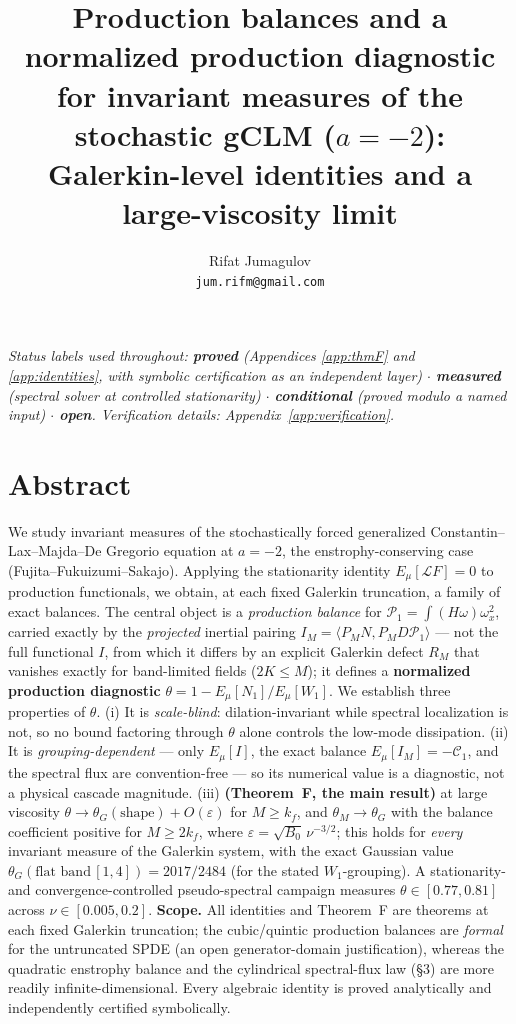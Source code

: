 \documentclass[11pt]{article}
\title{Production balances and a normalized production diagnostic for invariant measures of the stochastic gCLM ($a=-2$): Galerkin-level identities and a large-viscosity limit}
\author{Rifat Jumagulov\\ \texttt{jum.rifm@gmail.com}}
\date{}
\theoremstyle{remark}
\theoremstyle{plain}
\begin{document}
\maketitle

\begin{center}
\emph{Status labels used throughout: \textbf{proved} (Appendices \ref{app:thmF} and
\ref{app:identities}, with symbolic certification as an independent layer) $\cdot$
\textbf{measured} (spectral solver at controlled stationarity) $\cdot$ \textbf{conditional}
(proved modulo a named input) $\cdot$ \textbf{open}. Verification details: Appendix~\ref{app:verification}.}
\end{center}

\bigskip

\section*{Abstract}

We study invariant measures of the stochastically forced generalized
Constantin--Lax--Majda--De Gregorio equation at $a=-2$, the enstrophy-conserving case
(Fujita--Fukuizumi--Sakajo). Applying the stationarity identity $E_\mu[\mathcal{L}F]=0$ to
production functionals, we obtain, at each fixed Galerkin truncation, a family of exact
balances. The central object is a \emph{production balance} for
$\mathcal{P}_1 = \int(H\omega)\omega_x^2$, carried exactly by the \emph{projected} inertial
pairing $I_M = \langle P_M N, P_M D\mathcal{P}_1\rangle$ --- not the full functional $I$, from
which it differs by an explicit Galerkin defect $R_M$ that vanishes exactly for band-limited
fields ($2K \le M$); it
defines a \textbf{normalized production diagnostic} $\theta = 1 - E_\mu[N_1]/E_\mu[W_1]$. We
establish three properties of $\theta$. (i) It is \emph{scale-blind}: dilation-invariant while
spectral localization is not, so no bound factoring through $\theta$ alone controls the low-mode
dissipation. (ii) It is \emph{grouping-dependent} --- only $E_\mu[I]$, the exact balance
$E_\mu[I_M] = -\mathcal{C}_1$, and the spectral flux are
convention-free --- so its numerical value is a diagnostic, not a physical cascade magnitude.
(iii) \textbf{(Theorem~F, the main result)} at large viscosity
$\theta \to \theta_G(\text{shape}) + O(\varepsilon)$ for $M \ge k_f$, and $\theta_M \to \theta_G$ with the
balance coefficient positive for $M \ge 2k_f$, where $\varepsilon = \sqrt{B_0}\,\nu^{-3/2}$; this holds for
\emph{every} invariant measure of the Galerkin system, with the exact Gaussian value
$\theta_G(\text{flat band}\,[1,4]) = 2017/2484$ (for the stated $W_1$-grouping). A stationarity- and convergence-controlled
pseudo-spectral campaign measures $\theta \in [0.77, 0.81]$ across $\nu \in [0.005, 0.2]$.
\textbf{Scope.} All identities and Theorem~F are theorems at each fixed Galerkin truncation; the
cubic/quintic production balances are \emph{formal} for the untruncated SPDE (an open
generator-domain justification), whereas the quadratic enstrophy balance and the cylindrical
spectral-flux law (\S3) are more readily infinite-dimensional. Every algebraic identity is proved
analytically and independently certified symbolically.
\end{document}
